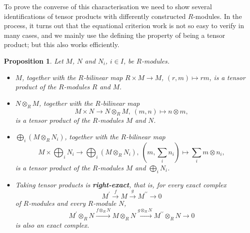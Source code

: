 \documentclass{amsart}
\theoremstyle{plain}
\numberwithin{equation}{section} %
\numberwithin{figure}{section} %
\theoremstyle{plain}
\theoremstyle{plain}
\theoremstyle{plain}
\theoremstyle{plain}
\theoremstyle{plain}
\newtheorem{prop}[thm]{Proposition} %
\theoremstyle{plain}
\theoremstyle{remark}
\theoremstyle{remark}
\theoremstyle{remark}
\begin{document}
To prove the converse of this characterisation we need to show several identifications of tensor products with differently constructed $R$-modules. In the process, it turns out that the equational criterion work is not so easy to verify in many cases, and we mainly use the defining the property of being a tensor product; but this also works efficiently.
\begin{prop} \label{tensor-prod-ident-prop}
Let $M$, $N$ and $N_i$, $i \in I$, be $R$-modules.
\begin{itemize}
\item[(a)] $M$, together with the $R$-bilinear map $R \times M \rightarrow M$, $(r,m) \mapsto rm$, is a tensor product of the $R$-modules $R$ and $M$.
\item[(b)] $N \otimes_R M$, together with the $R$-bilinear map 
\[ M \times N \rightarrow N \otimes_R M,\ (m,n) \mapsto n \otimes m, \] 
is a tensor product of the $R$-modules $M$ and $N$.
\item[(c)] $\bigoplus_i \left( M \otimes_R N_i\right)$, together with the $R$-bilinear map 
\[ M \times \bigoplus_i N_i \rightarrow \bigoplus_i \left( M \otimes_R N_i\right),\ 
   (m, \sum_i n_i) \mapsto \sum_i m \otimes n_i,\] 
is a tensor product of the $R$-modules $M$ and $\bigoplus_i N_i$.
\item[(d)] \label{tensor-right-ex-prop}
Taking tensor products is \textbf{right-exact}, that is, for every exact complex 
\[ M^\prime \stackrel{f}{\rightarrow} M \stackrel{g}{\rightarrow} M^{\prime\prime}  
      \rightarrow 0 \] 
of $R$-modules and every $R$-module $N$,
\[ M^\prime \otimes_R N \stackrel{f \otimes_R N}{\longrightarrow} M \otimes_R N 
                \stackrel{g \otimes_R N}{\longrightarrow} M^{\prime\prime} \otimes_R N \longrightarrow 0 \]
is also an exact complex. 
\end{itemize}
\end{prop}
\end{document}
